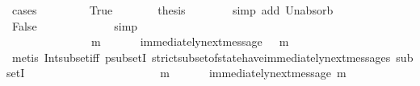 \begin{isabellebody}
\ {\isacharparenleft}cases\ {\isachardoublequoteopen}{\isasymsigma}{}\ {\isasymsubseteq}\ {\isasymsigma}{}{\isachardoublequoteclose}{\isacharparenright}\isanewline
\ \ \ \ \isamarkupfalse%
\ True\isanewline
\ \ \ \ \isamarkupfalse%
\ \isamarkupfalse%
\ {\isacharquery}thesis\isanewline
\ \ \ \ \ \ \isamarkupfalse%
\ {\isacharparenleft}simp\ add{\isacharcolon}\ Un{\isacharunderscore}absorb{}\ {\isacartoucheopen}{\isasymsigma}{}\ {\isasymin}\ {\isasymSigma}{\isacartoucheclose}{\isacharparenright}\isanewline
\ \ \isamarkupfalse%
\isanewline
\ \ \ \ \isamarkupfalse%
\ False\isanewline
\ \ \ \ \isamarkupfalse%
\ \isamarkupfalse%
\ {\isachardoublequoteopen}{\isasymnot}\ {\isasymsigma}{}\ {\isasymsubseteq}\ {\isasymsigma}{}{\isachardoublequoteclose}\ \isamarkupfalse%
\ simp\isanewline
\ \ \ \ \isamarkupfalse%
\ {\isachardoublequoteopen}{\isasymforall}\ {\isasymsigma}\ {\isasymin}\ {\isasymSigma}{\isachardot}\ {\isasymforall}\ {\isasymsigma}{\isacharprime}\ {\isasymin}\ {\isasymSigma}{\isachardot}\ {\isasymnot}\ {\isasymsigma}\ {\isasymsubseteq}\ {\isasymsigma}{\isacharprime}\ {\isasymlongrightarrow}\ {\isacharparenleft}{\isasymexists}\ m\ {\isasymin}\ {\isasymsigma}\ {\isacharminus}\ {\isacharparenleft}{\isasymsigma}\ {\isasyminter}\ {\isasymsigma}{\isacharprime}{\isacharparenright}{\isachardot}\ immediately{\isacharunderscore}next{\isacharunderscore}message{\isacharparenleft}{\isasymsigma}\ {\isasyminter}\ {\isasymsigma}{\isacharprime}{\isacharcomma}\ m{\isacharparenright}{\isacharparenright}{\isachardoublequoteclose}\isanewline
\ \ \ \ \ \ \isamarkupfalse%
\ {\isacharparenleft}metis\ Int{\isacharunderscore}subset{\isacharunderscore}iff\ psubsetI\ strict{\isacharunderscore}subset{\isacharunderscore}of{\isacharunderscore}state{\isacharunderscore}have{\isacharunderscore}immediately{\isacharunderscore}next{\isacharunderscore}messages\ subsetI{\isacharparenright}\ \ \isanewline
\ \ \ \ \isamarkupfalse%
\ \isamarkupfalse%
\ {\isachardoublequoteopen}{\isasymforall}\ {\isasymsigma}\ {\isasymin}\ {\isasymSigma}{\isachardot}\ {\isasymforall}\ {\isasymsigma}{\isacharprime}\ {\isasymin}\ {\isasymSigma}{\isachardot}\ {\isasymnot}\ {\isasymsigma}\ {\isasymsubseteq}\ {\isasymsigma}{\isacharprime}\ {\isasymlongrightarrow}\ {\isacharparenleft}{\isasymexists}\ m\ {\isasymin}\ {\isasymsigma}\ {\isacharminus}\ {\isacharparenleft}{\isasymsigma}\ {\isasyminter}\ {\isasymsigma}{\isacharprime}{\isacharparenright}{\isachardot}\ immediately{\isacharunderscore}next{\isacharunderscore}message{\isacharparenleft}{\isasymsigma}{\isacharprime}{\isacharcomma}\ m{\isacharparenright}{\isacharparenright}{\isachardoublequoteclose}\isanewline

\end{isabellebody}
